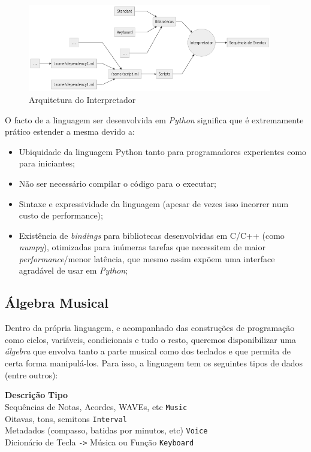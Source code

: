 \begin{figure}[h]
\begin{center}
    \includegraphics[width=0.95\textwidth]{img/diagram_virtualmachine.png}
\end{center}
\caption{Arquitetura do Interpretador}
\end{figure}
O facto de a linguagem ser desenvolvida em \textit{Python} significa que é extremamente prático estender a mesma devido a:
\begin{itemize}
    \item Ubiquidade da linguagem Python tanto para programadores experientes como para iniciantes;
    \item Não ser necessário compilar o código para o executar;
    \item Sintaxe e expressividade da linguagem (apesar de vezes isso incorrer num custo de performance);
    \item Existência de \textit{bindings} para bibliotecas desenvolvidas em C/C++ (como \textit{numpy}), otimizadas para inúmeras tarefas que necessitem de maior \textit{performance}/menor latência, que mesmo assim expõem uma interface agradável de usar em \textit{Python};
\end{itemize}

\subsection{Álgebra Musical}
Dentro da própria linguagem, e acompanhado das construções de programação como ciclos, variáveis, condicionais e tudo o resto, queremos disponibilizar uma \textit{álgebra} que envolva tanto a parte musical como dos teclados e que permita de certa forma manipulá-los. Para isso, a linguagem tem os seguintes tipos de dados (entre outros):

\medskip

\noindent
\textbf{Descrição}  \hfill  \textbf{Tipo} \ \  \\
Sequências de Notas, Acordes, WAVEs, etc \dotfill  \texttt{Music}  \\
Oitavas, tons, semitons \dotfill  \texttt{Interval} \\
Metadados (compasso, batidas por minutos, etc) \dotfill  \texttt{Voice} \\
Dicionário de Tecla \texttt{->} Música ou Função \dotfill  \texttt{Keyboard} \\


